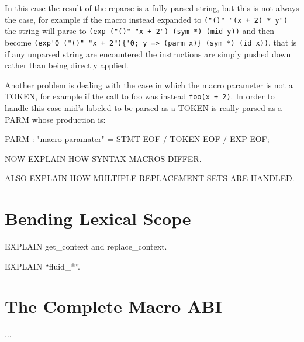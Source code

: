 \documentclass[12pt,english,letterpaper]{article}
\begin{document}
In this case the result of the reparse is a fully parsed string, but
this is not always the case, for example if the macro instead expanded
to \verb/("()" "(x + 2) * y")/ the string will parse to
\verb/(exp ("()" "x + 2") (sym *) (mid y))/ and then become
\verb/(exp'0 ("()" "x + 2"){'0; y => (parm x)} (sym *) (id x))/, that
is if any unparsed string are encountered the instructions are simply
pushed down rather than being directly applied.

Another problem is dealing with the case in which the macro parameter
is not a TOKEN, for example if the call to foo was instead
\verb/foo(x + 2)/.  In order to handle this case mid's labeled to be
parsed as a TOKEN is really parsed as a PARM whose production is:

\begin{code}
PARM : "macro paramater" = 
   {STMT} EOF / {TOKEN} EOF / {EXP} EOF;
\end{code}

NOW EXPLAIN HOW SYNTAX MACROS DIFFER.

ALSO EXPLAIN HOW MULTIPLE REPLACEMENT SETS ARE HANDLED.

\section{Bending Lexical Scope}

EXPLAIN get\_context and replace\_context.

EXPLAIN ``fluid\_*''.

\section{The Complete Macro ABI}

...
\end{document}
